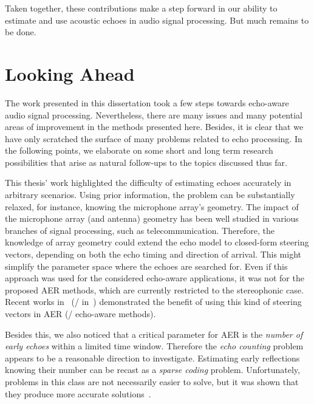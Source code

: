 \begin{itemize}
\begin{itemize}[label={\scriptsize\faCode}]
    \end{itemize}

\end{itemize}

\mynewline
Taken together, these contributions make a step forward in our ability to estimate and use acoustic echoes in audio signal processing.
But much remains to be done.

\section{Looking Ahead}
The work presented in this dissertation took a few steps towards echo-aware audio signal processing.
Nevertheless, there are many issues and many potential areas of improvement in the methods presented here.
Besides, it is clear that we have only scratched the surface of many problems related to echo processing.
In the following points, we elaborate on some short and long term research possibilities that arise as natural follow-ups to the topics discussed thus far.


This thesis' work highlighted the difficulty of estimating echoes accurately in arbitrary scenarios.
Using prior information, the problem can be substantially relaxed, for instance, knowing the microphone array's geometry.
The impact of the microphone array (and antenna) geometry has been well studied in various branches of signal processing, such as telecommunication.
Therefore, the knowledge of array geometry could extend the echo model to closed-form steering vectors, depending on both the echo timing and direction of arrival.
This might simplify the parameter space where the echoes are searched for.
Even if this approach was used for the considered echo-aware applications, it was not for the proposed \ac{AER} methods, which are currently restricted to the stereophonic case.
Recent works in~ (\resp/ in~) demonstrated the benefit of using this kind of steering vectors in \ac{AER} (\resp/ echo-aware methods).

\mynewline
Besides this, we also noticed that a critical parameter for \ac{AER} is the \textit{number of early echoes} within a limited time window.
Therefore the \textit{echo counting} problem appears to be a reasonable direction to investigate.
Estimating early reflections knowing their number can be recast as a \textit{sparse coding} problem.
Unfortunately, problems in this class are not necessarily easier to solve, but it was shown that they produce more accurate solutions~.

